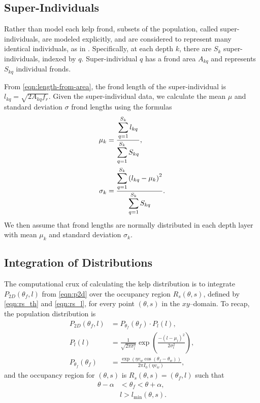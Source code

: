 \subsection{Super-Individuals}
\label{sec:si}

Rather than model each kelp frond, subsets of the population, called super-individuals, are modeled explicitly, and are considered to represent many identical individuals, as in \citep{scheffer_super-individuals_1994}.
Specifically, at each depth $k$, there are $S_k$ super-individuals, indexed by $q$.
Super-individual $q$ has a frond area $A_{kq}$ and represents $S_{kq}$ individual fronds.

From \eqref{eqn:length-from-area}, the frond length of the super-individual is $l_{kq} = \sqrt{2A_{kq}f_r}$.
Given the super-individual data, we calculate the mean $\mu$ and standard deviation $\sigma$ frond
lengths using the formulas
\begin{align}
  \mu_k &= \frac{\displaystyle \sum_{q=1}^{S_k} l_{kq}}{\displaystyle \sum_{q=1}^{S_k} S_{kq}},
  \label{eqn:si_mean} \\
  \sigma_k &= \frac{\displaystyle \sum_{q=1}^{S_k} \left( l_{kq} - \mu_k \right)^2}{\displaystyle \sum_{q=1}^{S_k} S_{kq}}.
  \label{eqn:si_std}
\end{align}
We then assume that frond lengths are normally distributed in each depth layer
with mean $\mu_k$ and standard deviation $\sigma_k$.

\subsection{Integration of Distributions}
The computational crux of calculating the kelp distribution is to integrate $P_{2D}(\theta_f, l)$ from \eqref{eqn:p2d} over the occupancy region $R_s(\theta, s)$, defined by \eqref{eqn:rs_th} and \eqref{eqn:rs_l}, for every point $(\theta,s)$ in the $xy$--domain.
To recap, the population distribution is
\begin{align*}
	P_{2D}(\theta_f,l) &= P_{\theta_f}(\theta_f) \cdot P_l(l), \\
  P_l(l) &= \frac{1}{\sqrt{2\pi\sigma_l^2}}\exp\left(\frac{-(l-\mu_l)^2}{2\sigma_l^2}\right), \\
	P_{\theta_f}(\theta_f) &= \frac{\exp\left(\eta v_w\cos(\theta_f-\theta_w)\right)}{2\pi I_0(\eta v_w)},
\end{align*}
and the occupancy region for $(\theta, s)$ is $R_s(\theta, s) = (\theta_f, l)$ such that
\begin{align*}
	\theta - \alpha &< \theta_f < \theta + \alpha, \\
	&l > l_{\min}(\theta,s).
\end{align*}

